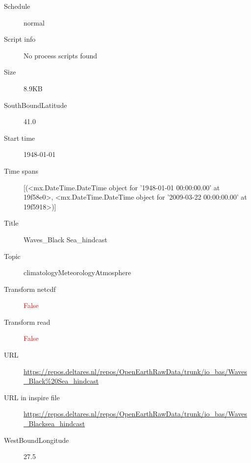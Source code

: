 \documentclass[9]{report}
\begin{document}
\begin{description}
\begin{verbatim}
\end{verbatim}
  \item[Schedule] normal
  \item[Script info] No process scripts found
  \item[Size] 8.9KB
  \item[SouthBoundLatitude] 41.0
  \item[Start time] 1948-01-01
  \item[Time spans] [(<mx.DateTime.DateTime object for '1948-01-01 00:00:00.00' at 19f58e0>, <mx.DateTime.DateTime object for '2009-03-22 00:00:00.00' at 19f5918>)]
  \item[Title]  Waves\_Black Sea\_hindcast 
  \item[Topic] climatologyMeteorologyAtmosphere
  \item[Transform netcdf] \textcolor{red}{False}
  \item[Transform read] \textcolor{red}{False}
  \item[URL] \href{https://repos.deltares.nl/repos/OpenEarthRawData/trunk/io\_bas/Waves\_Black\%20Sea\_hindcast}{https://repos.deltares.nl/repos/OpenEarthRawData/trunk/io\_bas/Waves\_Black\%20Sea\_hindcast}
  \item[URL in inspire file] \href{https://repos.deltares.nl/repos/OpenEarthRawData/trunk/io\_bas/Waves\_Blacksea\_hindcast}{https://repos.deltares.nl/repos/OpenEarthRawData/trunk/io\_bas/Waves\_Blacksea\_hindcast}
  \item[WestBoundLongitude] 27.5
\end{description}
\end{document}
